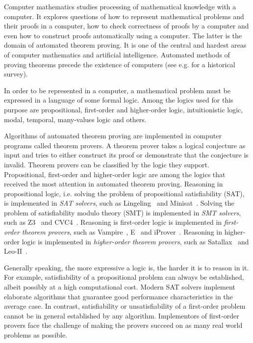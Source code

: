 Computer mathematics studies processing of mathematical knowledge with a computer. It explores questions of how to represent mathematical problems and their proofs in a computer, how to check correctness of proofs by a computer and even how to construct proofs automatically using a computer. The latter is the domain of automated theorem proving. It is one of the central and hardest areas of computer mathematics and artificial intelligence. Automated methods of proving theorems precede the existence of computers (see e.g. \cite{bundy1999survey,davis2001early,harrison2007short} for a historical survey).

In order to be represented in a computer, a mathematical problem must be expressed in a language of some formal logic. Among the logics used for this purpose are propositional, first-order and higher-order logic, intuitionistic logic, modal, temporal, many-values logic and others.

Algorithms of automated theorem proving are implemented in computer programs called theorem provers. A theorem prover takes a logical conjecture as input and tries to either construct its proof or demonstrate that the conjecture is invalid. Theorem provers can be classified by the logic they support. Propositional, first-order and higher-order logic are among the logics that received the most attention in automated theorem proving. Reasoning in propositional logic, i.e. solving the problem of propositional satisfiability (SAT), is implemented in \emph{SAT solvers}, such as Lingeling~\cite{Lingeling} and Minisat~\cite{Minisat}. Solving the problem of satisfiability modulo theory (SMT) is implemented in \emph{SMT solvers}, such as Z3~\cite{Z3} and CVC4~\cite{CVC4}. Reasoning is first-order logic is implemented in \emph{first-order theorem provers}, such as Vampire~\cite{Vampire13}, E~\cite{E13} and iProver~\cite{iProver}. Reasoning in higher-order logic is implemented in \emph{higher-order theorem provers}, such as Satallax~\cite{Satallax} and Leo-II~\cite{LeoII}.

Generally speaking, the more expressive a logic is, the harder it is to reason in it. For example, satisfiability of a propositional problem can always be established, albeit possibly at a high computational cost. Modern SAT solvers implement elaborate algorithms that guarantee good performance characteristics in the average case. In contrast, satisfiability or unsatisfiability of a first-order problem cannot be in general established by any algorithm. Implementors of first-order provers face the challenge of making the provers succeed on as many real world problems as possible.

